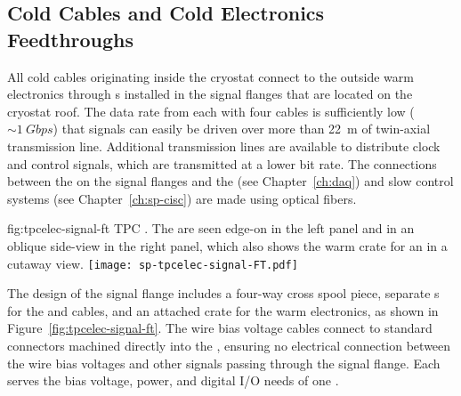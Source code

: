 \subsection{Cold Cables and Cold Electronics Feedthroughs}
\label{sec:fdsp-tpcelec-design-ft}

All cold cables originating inside the cryostat connect to the outside 
warm electronics through  \fdth{}s installed in the signal 
flanges that are located on the cryostat roof. The data rate from each
 with four cables is sufficiently low ($\sim\SI{1}{Gbps}$)
that  signals can easily be driven over more than \SI{22}{m}
of twin-axial transmission line. Additional transmission lines
are available to distribute  clock and control signals,
which are transmitted at a lower bit rate. The connections 
between the  on the signal flanges and the 
 (see Chapter~\ref{ch:daq}) and slow 
control systems (see Chapter~\ref{ch:sp-cisc}) are made
using optical fibers.

\begin{dunefigure}
{fig:tpcelec-signal-ft}
{TPC  \fdth. The  are seen edge-on in the left 
panel and in an oblique side-view in the right panel, which also shows 
the warm crate for an  in a cutaway view.}
\texttt{[image: sp-tpcelec-signal-FT.pdf]}
\end{dunefigure}

The design of the signal flange includes a four-way cross spool 
piece, separate  \fdth{}s for the  and 
 cables, and an attached crate for the  
warm electronics, as shown in Figure~\ref{fig:tpcelec-signal-ft}.
The wire bias voltage cables connect to standard  
connectors machined directly into the  \fdth{}, ensuring 
no electrical connection between the wire bias voltages and other 
signals passing through the signal flange. Each  \fdth 
serves the bias voltage, power, and digital I/O needs of one .  

